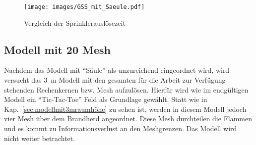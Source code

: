 \begin{figure}
    \centering
    \texttt{[image: images/GSS\_mit\_Saeule.pdf]}
    \caption{Vergleich der Sprinklerauslösezeit}
    \label{fig:GSS_mit_Saeule}
\end{figure}

\subsection{Modell mit 20 Mesh}
Nachdem das Modell mit "`Säule"' als unzureichend eingeordnet wird, wird versucht das 3~m Modell mit den gesamten für die Arbeit zur Verfügung stehenden Rechenkernen bzw. Mesh aufzulösen. Hierfür wird wie im endgültigen Modell ein "`Tic-Tac-Toe"' Feld als Grundlage gewählt. Statt wie in Kap.~\ref{sec:modellmit3mraumhöhe} zu sehen ist, werden in diesem Modell jedoch vier Mesh über dem Brandherd angeordnet. Diese Mesh durchteilen die Flammen und es kommt zu Informationsverlust an den Meshgrenzen. Das Modell wird nicht weiter betrachtet.












